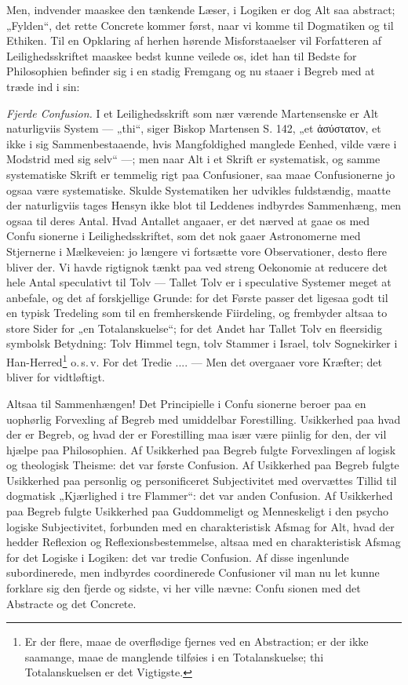 \documentclass[12pt]{book}
\newcommand{\opage}[1]{\marginnote{\footnotesize\textit{[#1]}}}
\begin{document}
Men, indvender maaskee den tænkende Læser, i Logiken
er dog Alt saa abstract; „Fylden“, det rette Concrete kommer
først, naar vi komme til Dogmatiken og til Ethiken. Til en
Opklaring af herhen hørende Misforstaaelser vil Forfatteren
af Leilighedsskriftet maaskee bedst kunne veilede os, idet han
til Bedste for Philosophien befinder sig i en stadig Fremgang
og nu staaer i Begreb med at træde ind i sin:

\emph{Fjerde Confusion.} I et Leilighedsskrift som nær\-%
værende Martensenske er Alt naturligviis System --- „thi“,
siger Biskop Martensen S. 142, „et ἀσύστατον, et ikke i
sig Sammenbestaaende, hvis Mangfoldighed manglede Eenhed,
vilde være i Modstrid med sig selv“ ---; men naar Alt i et
Skrift er systematisk, og samme systematiske Skrift er temmelig
rigt paa Confusioner, saa maae Confusionerne jo ogsaa være
systematiske. Skulde Systematiken her udvikles fuldstændig,
maatte der naturligviis tages Hensyn ikke blot til Leddenes
indbyrdes Sammenhæng, men ogsaa til deres Antal. Hvad
Antallet angaaer, er det nærved at gaae os med Confu\-%
sionerne i Leilighedsskriftet, som det nok gaaer Astronomerne
med Stjernerne i Mælkeveien: jo længere vi fortsætte
vore Observationer, desto flere bliver der. Vi havde rigtignok
\opage{127}\setcounter{footnote}{0}%
tænkt paa ved streng Oekonomie at reducere det hele
Antal speculativt til Tolv --- Tallet Tolv er i speculative
Systemer meget at anbefale, og det af forskjellige Grunde:
for det Første passer det ligesaa godt til en typisk Tredeling
som til en fremherskende Fiirdeling, og frembyder altsaa to
store Sider for „en Totalanskuelse“; for det Andet har
Tallet Tolv en fleersidig symbolsk Betydning: Tolv Himmel\-%
tegn, tolv Stammer i Israel, tolv Sognekirker i Han-Herred\footnote{Er der flere, maae de overflødige fjernes ved en Abstraction; er
der ikke saamange, maae de manglende tilføies i en Totalanskuelse;
thi Totalanskuelsen er det Vigtigste.}
o.\,s.\,v. For det Tredie .... --- Men det overgaaer vore
Kræfter; det bliver for vidtløftigt.

Altsaa til Sammenhængen! Det Principielle i Confu\-%
sionerne beroer paa en uophørlig Forvexling af Begreb med
umiddelbar Forestilling. Usikkerhed paa hvad der er Begreb,
og hvad der er Forestilling maa især være piinlig for den,
der vil hjælpe paa Philosophien. Af Usikkerhed paa Begreb
fulgte Forvexlingen af logisk og theologisk Theisme: det
var første Confusion. Af Usikkerhed paa Begreb fulgte
Usikkerhed paa personlig og personificeret Subjectivitet med
overvættes Tillid til dogmatisk „Kjærlighed i tre Flammer“:
det var anden Confusion. Af Usikkerhed paa Begreb fulgte
Usikkerhed paa Guddommeligt og Menneskeligt i den psycho\-%
logiske Subjectivitet, forbunden med en charakteristisk Afsmag
for Alt, hvad der hedder Reflexion og Reflexionsbestemmelse,
altsaa med en charakteristisk Afsmag for det Logiske i Logiken:
det var tredie Confusion. Af disse ingenlunde subordinerede,
men indbyrdes coordinerede Confusioner vil man nu let kunne
forklare sig den fjerde og sidste, vi her ville nævne: Confu\-%
sionen med det Abstracte og det Concrete.
\end{document}
